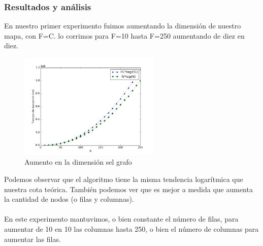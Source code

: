 \documentclass[spanish,12pt]{article}
\begin{document}
\subsubsection{Resultados y análisis}

En nuestro primer experimento fuimos aumentando la dimensión de nuestro mapa, con F=C. lo corrimos para F=10 hasta F=250 aumentando de diez en diez.

\begin{figure}[H]
\centering
\includegraphics[width=0.6\textwidth]{sinParedes}
\caption{Aumento en la dimensión sel grafo}
\end{figure}


Podemos observar que el algoritmo tiene la misma tendencia logarítmica que nuestra cota teórica. También podemos ver que es mejor a medida que aumenta la cantidad de nodos (o filas y columnas).
\\
\\

En este experimento mantuvimos, o bien constante el número de filas, para aumentar de 10 en 10 las columnas hasta 250, o bien el número de columnas para aumentar las filas. 
\end{document}
